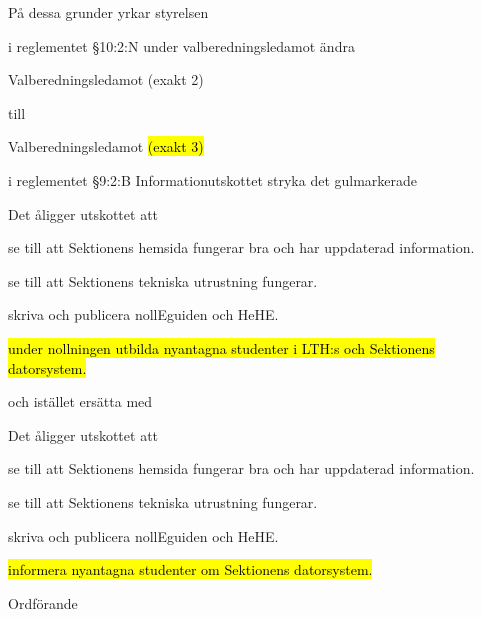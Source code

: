 \documentclass[../_main/handlingar.tex]{subfiles}
\begin{document}
På dessa grunder yrkar styrelsen
\begin{attsatser}
    
    \att i reglementet \S10:2:N  under valberedningsledamot ändra
        \begin{emptylist}
            \item Valberedningsledamot (exakt 2)
         \end{emptylist}
    
        till 
    
        \begin{emptylist}
            \item Valberedningsledamot \hl{(exakt 3)}
        \end{emptylist}
        \changenote

    \att i reglementet \S9:2:B Informationutskottet stryka det gulmarkerade 
        \begin{emptylist}
            \item Det åligger utskottet att
            \begin{dashlist}
                \item se till att Sektionens hemsida fungerar bra och har uppdaterad information.
                \item se till att Sektionens tekniska utrustning fungerar.
                \item skriva och publicera nollEguiden och HeHE.
                \item \hl{under nollningen utbilda nyantagna studenter i LTH:s och Sektionens datorsystem.}
            \end{dashlist}
        \end{emptylist}
    
        och istället ersätta med
    
        \begin{emptylist}
            \item Det åligger utskottet att
            \begin{dashlist}
                \item se till att Sektionens hemsida fungerar bra och har uppdaterad information.
                \item se till att Sektionens tekniska utrustning fungerar.
                \item skriva och publicera nollEguiden och HeHE.
                \item \hl{informera nyantagna studenter om Sektionens datorsystem.}
            \end{dashlist}
        \end{emptylist}
        \changenote
        
    

\end{attsatser}







\begin{signatures}{1}
    \ist
    \signature{\ordf}{Ordförande}

\end{signatures}
\end{document}
